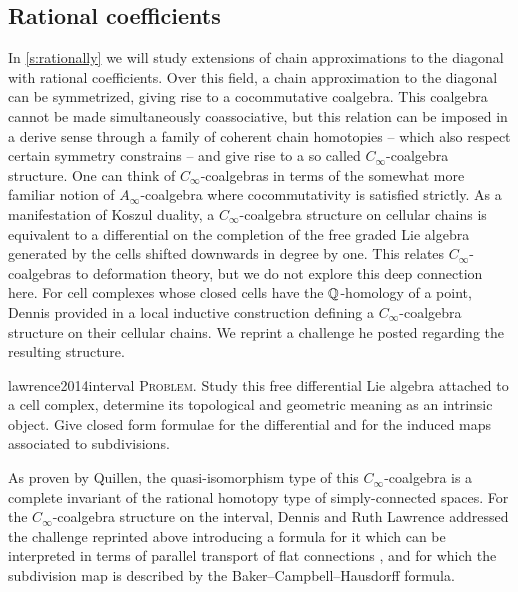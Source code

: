 \subsection*{Rational coefficients}

In \cref{s:rationally} we will study extensions of chain approximations to the diagonal with rational coefficients.
Over this field, a chain approximation to the diagonal can be symmetrized, giving rise to a cocommutative coalgebra.
This coalgebra cannot be made simultaneously coassociative, but this relation can be imposed in a derive sense through a family of coherent chain homotopies -- which also respect certain symmetry constrains -- and give rise to a so called $C_\infty$-coalgebra structure.
One can think of $C_\infty$-coalgebras in terms of the somewhat more familiar notion of $A_\infty$-coalgebra where cocommutativity is satisfied strictly.
As a manifestation of Koszul duality, a $C_\infty$-coalgebra structure on cellular chains is equivalent to a differential on the completion of the free graded Lie algebra generated by the cells shifted downwards in degree by one.
This relates $C_\infty$-coalgebras to deformation theory, but we do not explore this deep connection here.
For cell complexes whose closed cells have the $\mathbb{Q}$-homology of a point, Dennis provided in \cite{sullivan2007appendix} a local inductive construction defining a $C_\infty$-coalgebra structure on their cellular chains.
We reprint a challenge he posted regarding the resulting structure.
\begin{displaycquote}[p.2]{lawrence2014interval}
	\textsc{Problem}. Study this free differential Lie algebra attached to a cell complex, determine its topological and geometric meaning as an intrinsic object.
	Give closed form formulae for the differential and for the induced maps associated to subdivisions.
\end{displaycquote}
As proven by Quillen, the quasi-isomorphism type of this $C_\infty$-coalgebra is a complete invariant of the rational homotopy type of simply-connected spaces.
For the $C_\infty$-coalgebra structure on the interval, Dennis and Ruth Lawrence addressed the challenge reprinted above introducing a formula for it which can be interpreted in terms of parallel transport of flat connections \cite{lawrence2014interval}, and for which the subdivision map is described by the Baker--Campbell--Hausdorff formula.

